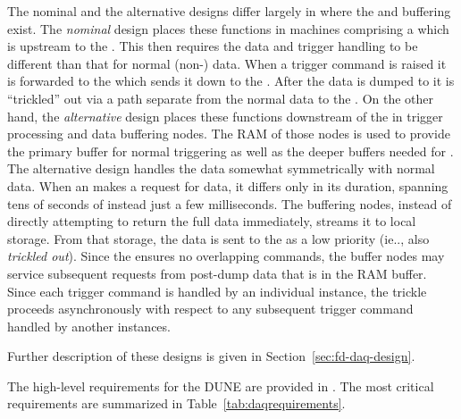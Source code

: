 The nominal and the alternative  designs differ largely in where
the  and  buffering exist. 
The \textit{nominal} design places these functions in machines
comprising a  which is upstream to the . 
This then requires the  data and trigger handling to be
different than that for normal (non-) data. 
When a  trigger command is raised it is forwarded to the
 which sends it down to the . 
After the  data is dumped to  it is
``trickled'' out via a path separate from the normal data to the
. 
On the other hand, the \textit{alternative} design places these
functions downstream of the  in trigger processing and data
buffering nodes.
The RAM of those nodes is used to provide the primary  buffer for
normal triggering as well as the deeper buffers needed for . 
The alternative design handles the  data somewhat
symmetrically with normal data. 
When an  makes a request for  data, it differs
only in its duration, spanning tens of seconds of instead just a few
milliseconds. 
The  buffering nodes, instead of directly attempting to
return the full  data immediately, streams it to local
 storage. 
From that storage, the data is sent to the  as a low
priority (ie.., also \textit{trickled out}).
Since the  ensures no overlapping commands, the buffer
nodes may service subsequent requests from post-dump data that is %
in the RAM buffer.
Since each trigger command is handled by an individual 
instance, the trickle proceeds asynchronously with respect to any subsequent
trigger command handled by another  instances.

Further description of %
these designs
is
given in Section~\ref{sec:fd-daq-design}.


The high-level requirements for the DUNE   are provided in
\cite{daq:reqs}.
The most critical requirements %
are summarized in Table~\ref{tab:daqrequirements}.

